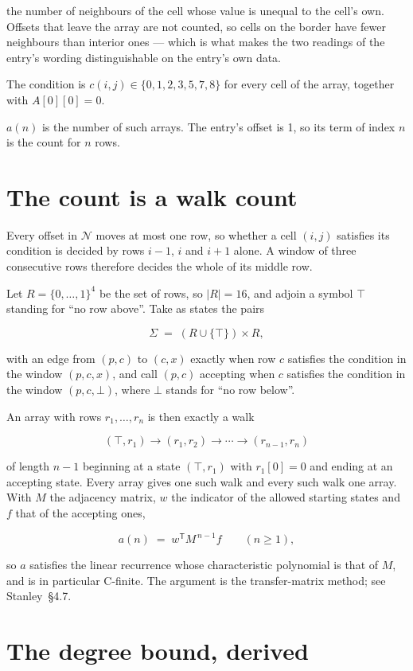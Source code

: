 \documentclass[11pt]{article}
\theoremstyle{definition}
\begin{document}
the number of neighbours of the cell whose value is unequal to the cell's own. Offsets that leave the array are not counted, so cells on the border have fewer neighbours than interior ones --- which is what makes the two readings of the entry's wording distinguishable on the entry's own data.

The condition is $c(i,j) \in \{0, 1, 2, 3, 5, 7, 8\}$ for every cell of the array, together with $A[0][0]=0$.

$a(n)$ is the number of such arrays. The entry's offset is 1, so its term of index $n$ is the count for $n$ rows.

\section{The count is a walk count}

Every offset in $\mathcal{N}$ moves at most one row, so whether a cell $(i,j)$ satisfies its condition is decided by rows $i-1$, $i$ and $i+1$ alone. A window of three consecutive rows therefore decides the whole of its middle row.

Let $R = \{0,\dots,1\}^{4}$ be the set of rows, so $|R| = 16$, and adjoin a symbol $\top$ standing for ``no row above''. Take as states the pairs

\[\Sigma \;=\; (R \cup \{\top\}) \times R,\]

with an edge from $(p,c)$ to $(c,x)$ exactly when row $c$ satisfies the condition in the window $(p,c,x)$, and call $(p,c)$ accepting when $c$ satisfies the condition in the window $(p,c,\bot)$, where $\bot$ stands for ``no row below''.

An array with rows $r_1,\dots,r_n$ is then exactly a walk

\[(\top,r_1) \to (r_1,r_2) \to \cdots \to (r_{n-1},r_n)\]

of length $n-1$ beginning at a state $(\top,r_1)$ with $r_1[0]=0$ and ending at an accepting state. Every array gives one such walk and every such walk one array. With $M$ the adjacency matrix, $w$ the indicator of the allowed starting states and $f$ that of the accepting ones,

\[a(n) \;=\; w^{\mathsf T} M^{\,n-1} f \qquad (n \ge 1),\]

so $a$ satisfies the linear recurrence whose characteristic polynomial is that of $M$, and is in particular C-finite. The argument is the transfer-matrix method; see Stanley~\S4.7.

\section{The degree bound, derived}
\end{document}
